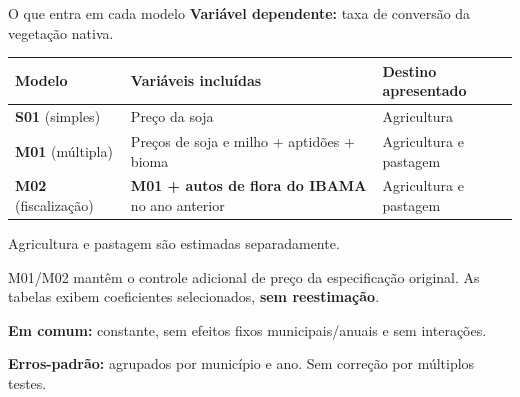 \documentclass[aspectratio=169,11pt]{beamer}
\newcommand{\fonte}[1]{\par\vfill{\fontsize{7.5}{9}\selectfont\color{gray}Fonte: #1\par}}
\newcommand{\tpar}{\par\vspace{2mm}}
\begin{document}
\begin{frame}{O que entra em cada modelo}
\small
\textbf{Variável dependente:} taxa de conversão da vegetação nativa.
\par\medskip
\begin{tabularx}{\textwidth}{P{2.8cm} L P{2.5cm}}
\toprule
\textbf{Modelo} & \textbf{Variáveis incluídas} & \textbf{Destino apresentado}\\
\midrule
\textbf{S01} (simples) & Preço da soja & Agricultura\\[2mm]
\textbf{M01} (múltipla) & Preços de soja e milho + aptidões + bioma & Agricultura e pastagem\\[2mm]
\textbf{M02} (fiscalização) & \textbf{M01 + autos de flora do IBAMA} no ano anterior & Agricultura e pastagem\\
\bottomrule
\end{tabularx}
\par\smallskip
Agricultura e pastagem são estimadas separadamente.
\tpar
{\footnotesize M01/M02 mantêm o controle adicional de preço da especificação original. As tabelas exibem coeficientes selecionados, \textbf{sem reestimação}.\par}
\tpar
\textbf{Em comum:} constante, sem efeitos fixos municipais/anuais e sem interações.
\tpar
\textbf{Erros-padrão:} agrupados por município e ano. Sem correção por múltiplos testes.
\end{frame}
\end{document}

